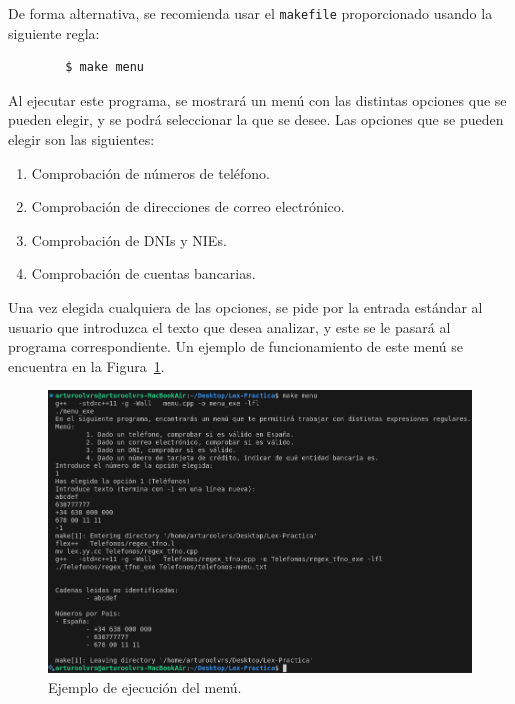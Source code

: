 \documentclass[12pt]{article}
\begin{document}
    De forma alternativa, se recomienda usar el \verb|makefile| proporcionado usando la siguiente regla:
    \begin{verbatim}
        $ make menu
    \end{verbatim}

    Al ejecutar este programa, se mostrará un menú con las distintas opciones que se pueden elegir, y se podrá seleccionar la que se desee. Las opciones que se pueden elegir son las siguientes:
    \begin{enumerate}
        \item Comprobación de números de teléfono.
        \item Comprobación de direcciones de correo electrónico.
        \item Comprobación de DNIs y NIEs.
        \item Comprobación de cuentas bancarias.
    \end{enumerate}

    Una vez elegida cualquiera de las opciones, se pide por la entrada estándar al usuario que introduzca el texto que desea analizar, y este se le pasará al programa correspondiente. Un ejemplo de funcionamiento de este menú se encuentra en la Figura~\ref{fig:menu}.
    \begin{figure}
        \centering
        \includegraphics[width=\textwidth]{Img/Funcionamiento_Menu.png}
        \caption{Ejemplo de ejecución del menú.}
        \label{fig:menu}
    \end{figure}
\end{document}
